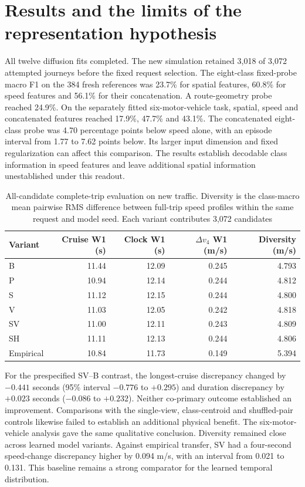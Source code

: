 \section{Results and the limits of the representation hypothesis}
All twelve diffusion fits completed. The new simulation retained 3,018 of 3,072 attempted journeys before the fixed request selection. The eight-class fixed-probe macro F1 on the 384 fresh references was 23.7\% for spatial features, 60.8\% for speed features and 56.1\% for their concatenation. A route-geometry probe reached 24.9\%. On the separately fitted six-motor-vehicle task, spatial, speed and concatenated features reached 17.9\%, 47.7\% and 43.1\%. The concatenated eight-class probe was 4.70 percentage points below speed alone, with an episode interval from 1.77 to 7.62 points below. Its larger input dimension and fixed regularization can affect this comparison. The results establish decodable class information in speed features and leave additional spatial information unestablished under this readout.

\begin{table}[htbp]
\centering\small
\begin{tabular}{lrrrr}
\toprule
Variant & Cruise W1 (s) & Clock W1 (s) & $\Delta v_4$ W1 (m/s) & Diversity (m/s)\\
\midrule
B & 11.44 & 12.09 & 0.245 & 4.793\\
P & 10.94 & 12.14 & 0.244 & 4.812\\
S & 11.12 & 12.15 & 0.244 & 4.800\\
V & 11.03 & 12.05 & 0.242 & 4.818\\
SV & 11.00 & 12.11 & 0.243 & 4.809\\
SH & 11.11 & 12.13 & 0.244 & 4.806\\
Empirical & 10.84 & 11.73 & 0.149 & 5.394\\
\bottomrule
\end{tabular}
\caption{All-candidate complete-trip evaluation on new traffic. Diversity is the class-macro mean pairwise RMS difference between full-trip speed profiles within the same request and model seed. Each variant contributes 3,072 candidates}
\label{tab:paired-results}
\end{table}

For the prespecified SV--B contrast, the longest-cruise discrepancy changed by $-0.441$ seconds (95\% interval $-0.776$ to $+0.295$) and duration discrepancy by $+0.023$ seconds ($-0.086$ to $+0.232$). Neither co-primary outcome established an improvement. Comparisons with the single-view, class-centroid and shuffled-pair controls likewise failed to establish an additional physical benefit. The six-motor-vehicle analysis gave the same qualitative conclusion. Diversity remained close across learned model variants. Against empirical transfer, SV had a four-second speed-change discrepancy higher by 0.094 m/s, with an interval from 0.021 to 0.131. This baseline remains a strong comparator for the learned temporal distribution.

